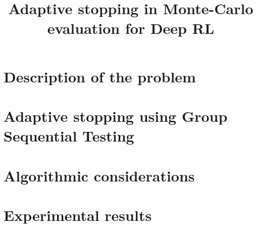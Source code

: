 \documentclass{article}
\title{Adaptive stopping in Monte-Carlo evaluation for Deep RL}
\date{}
\theoremstyle{plain}
\theoremstyle{remark}
\newcommand{\1}{\mathbbm{1}}
\numberwithin{equation}{section}
\begin{document}
\maketitle
\section{Description of the problem}
\section{Adaptive stopping using Group Sequential Testing}
\section{Algorithmic considerations}
\section{Experimental results}




\end{document}
